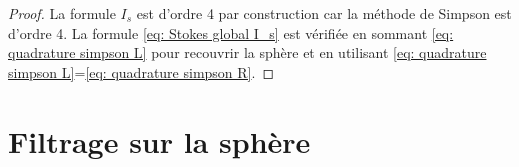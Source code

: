 \begin{proof}
La formule $I_s$ est d'ordre 4 par construction car la méthode de Simpson est d'ordre 4.
La formule \eqref{eq: Stokes global I_s} est vérifiée en sommant \eqref{eq: quadrature simpson L} pour recouvrir la sphère et en utilisant \eqref{eq: quadrature simpson L}=\eqref{eq: quadrature simpson R}.
\end{proof}



\section{Filtrage sur la sphère}